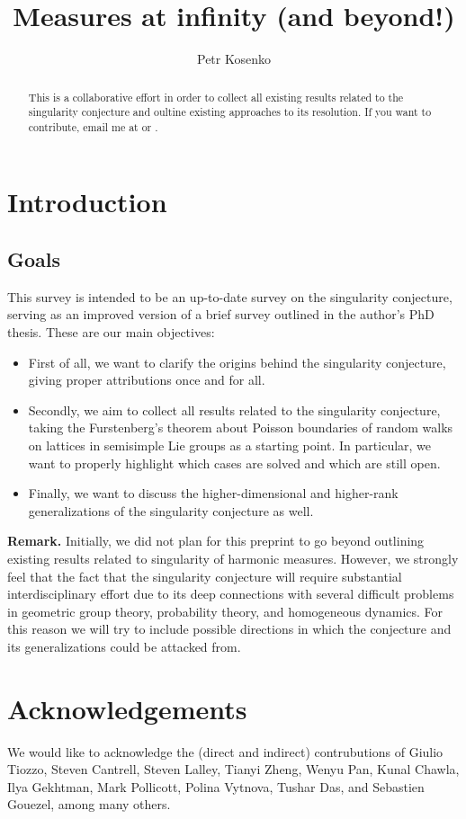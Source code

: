 \documentclass[11pt]{amsart}
\title{Measures at infinity (and beyond!)}
\author{Petr Kosenko}
\theoremstyle{definition}
\begin{document}
	\maketitle
	\begin{abstract}
		This is a collaborative effort in order to collect all existing results related to the singularity conjecture and oultine existing approaches to its resolution. If you want to contribute, email me at  or .
	\end{abstract}
	
	\section{Introduction}
	\subsection{Goals}
	This survey is intended to be an up-to-date survey on the singularity conjecture, serving as an improved version of a brief survey outlined in the author's PhD thesis. These are our main objectives:
	\begin{itemize}
		\item First of all, we want to clarify the origins behind the singularity conjecture, giving proper attributions once and for all.
		\item Secondly, we aim to collect all results related to the singularity conjecture, taking the Furstenberg's theorem about Poisson boundaries of random walks on lattices in semisimple Lie groups as a starting point. In particular, we want to properly highlight which cases are solved and which are still open.
		\item Finally, we want to discuss the higher-dimensional and higher-rank generalizations of the singularity conjecture as well.
	\end{itemize}
	\textbf{Remark.} Initially, we did not plan for this preprint to go beyond outlining existing results related to singularity of harmonic measures. However, we strongly feel that the fact that the singularity conjecture will require substantial interdisciplinary effort due to its deep connections with several difficult problems in geometric group theory, probability theory, and homogeneous dynamics. For this reason we will try to include possible directions in which the conjecture and its generalizations could be attacked from.
	
	\section{Acknowledgements}
	We would like to acknowledge the (direct and indirect) contrubutions of Giulio Tiozzo, Steven Cantrell, Steven Lalley, Tianyi Zheng, Wenyu Pan, Kunal Chawla, Ilya Gekhtman, Mark Pollicott, Polina Vytnova, Tushar Das, and Sebastien Gouezel, among many others.
	
\end{document}
